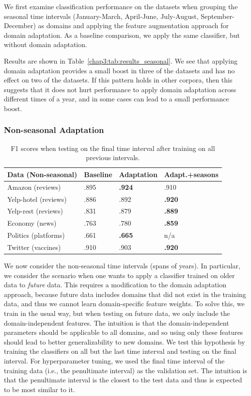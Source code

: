 We first examine classification performance on the datasets when grouping the seasonal time intervals (January-March, April-June, July-August, September-December) as domains and applying the feature augmentation approach for domain adaptation. 
As a baseline comparison, we apply the same classifier, but without domain adaptation.

Results are shown in Table~\ref{chap3:tab:results_seasonal}.
We see that applying domain adaptation provides a small boost in three of the datasets and has no effect on two of the datasets.
If this pattern holds in other corpora, then this suggests that it does not hurt performance to apply domain adaptation across different times of a year, and in some cases can lead to a small performance boost.

\subsubsection{Non-seasonal Adaptation}
\label{subsec:nonseasonal}

\begin{table}[htp]
\centering
\begin{tabular}{|l|l|l|l|}
\hline
\bf Data (Non-seasonal) & \bf Baseline & \bf Adaptation & \bf Adapt.+seasons \\
\hline
Amazon (reviews) & .895 & \bf .924 & .910 \\
Yelp-hotel (reviews) & .886 & .892 & \bf .920 \\
Yelp-rest (reviews) & .831 & .879 & \bf .889   \\
Economy (news) & .763 & .780 & \bf .859 \\
Politics (platforms) & .661 & \bf .665 & n/a \\
Twitter (vaccines) & .910 & .903 & \bf .920 \\
\hline
\end{tabular}
\caption{\label{chap3:tab:results_nonseasonal_future} F1 scores when testing on the final time interval after training on all previous intervals.}
\end{table}

We now consider the non-seasonal time intervals (spans of years). 
In particular, we consider the scenario when one wants to apply a classifier trained on older data to {\em future} data.
This requires a modification to the domain adaptation approach, because future data includes domains that did not exist in the training data, and thus we cannot learn domain-specific feature weights.
To solve this, we train in the usual way, but when testing on future data, we only include the domain-independent features.
The intuition is that the domain-independent parameters should be applicable to all domains, and so using only these features should lead to better generalizability to new domains.
We test this hypothesis by training the classifiers on all but the last time interval and testing on the final interval.
For hyperparameter tuning, we used the final time interval of the training data (i.e., the penultimate interval) as the validation set. The intuition is that the penultimate interval is the closest to the test data and thus is expected to be most similar to it.

